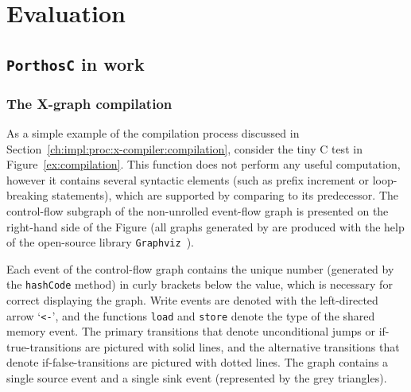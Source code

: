 \chapter{Evaluation}
\label{ch:eval}


\section{\texttt{PorthosC} in work}
\label{ch:eval:show}

\subsection{The X-graph compilation}
\label{ch:eval:show:compil}

As a simple example of the compilation process discussed in Section~\ref{ch:impl:proc:x-compiler:compilation}, consider the tiny C test in Figure~\ref{ex:compilation}.
This function does not perform any useful computation, however it contains several syntactic elements (such as prefix increment or loop-breaking statements), which are supported by \porthos[2] comparing to its predecessor.
The control-flow subgraph \xgraph[CF] of the non-unrolled event-flow graph is presented on the right-hand side of the Figure (all graphs generated by \porthos[2] are produced with the help of the open-source library \texttt{Graphviz}~\cite{ellson2001graphviz}).

Each event of the control-flow graph contains the unique number (generated by the \texttt{hashCode} method) in curly brackets below the value, which is necessary for correct displaying the graph.
Write events are denoted with the left-directed arrow `\lstinline{<-}', and the functions \lstinline{load} and \lstinline{store} denote the type of the shared memory event.
The primary transitions that denote unconditional jumps or if-true-transitions are pictured with solid lines, and the alternative transitions that denote if-false-transitions are pictured with dotted lines.
The graph contains a single source event and a single sink event (represented by the grey triangles).


